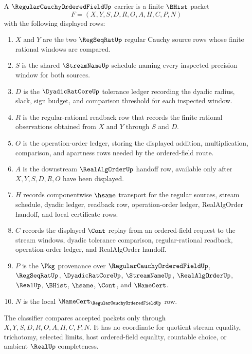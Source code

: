 \begin{definition}
\label{def:regular-cauchy-ordered-field-carrier}
A $\RegularCauchyOrderedFieldUp$ carrier is a finite $\BHist$ packet
$$
F=(X,Y,S,D,R,O,A,H,C,P,N)
$$
with the following displayed rows:
\begin{enumerate}
\item $X$ and $Y$ are the two $\RegSeqRatUp$ regular Cauchy source rows whose finite rational windows are compared.
\item $S$ is the shared $\StreamNameUp$ schedule naming every inspected precision window for both sources.
\item $D$ is the $\DyadicRatCoreUp$ tolerance ledger recording the dyadic radius, slack, sign budget, and comparison threshold for each inspected window.
\item $R$ is the regular-rational readback row that records the finite rational observations obtained from $X$ and $Y$ through $S$ and $D$.
\item $O$ is the operation-order ledger, storing the displayed addition, multiplication, comparison, and apartness rows needed by the ordered-field route.
\item $A$ is the downstream $\RealAlgOrderUp$ handoff row, available only after $X,Y,S,D,R,O$ have been displayed.
\item $H$ records componentwise $\hsame$ transport for the regular sources, stream schedule, dyadic ledger, readback row, operation-order ledger, RealAlgOrder handoff, and local certificate rows.
\item $C$ records the displayed $\Cont$ replay from an ordered-field request to the stream windows, dyadic tolerance comparison, regular-rational readback, operation-order ledger, and RealAlgOrder handoff.
\item $P$ is the $\Pkg$ provenance over $\RegularCauchyOrderedFieldUp$, $\RegSeqRatUp$, $\DyadicRatCoreUp$, $\StreamNameUp$, $\RealAlgOrderUp$, $\RealUp$, $\BHist$, $\hsame$, $\Cont$, and $\NameCert$.
\item $N$ is the local $\NameCert_{\RegularCauchyOrderedFieldUp}$ row.
\end{enumerate}
The classifier compares accepted packets only through $X,Y,S,D,R,O,A,H,C,P,N$. It has no coordinate for quotient stream equality, trichotomy, selected limits, host ordered-field equality, countable choice, or ambient $\RealUp$ completeness.
\end{definition}


